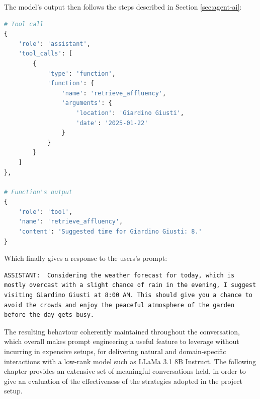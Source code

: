 The model's output then follows the steps described in Section \ref{sec:agent-ai}:

\begin{center}
\begin{minipage}{0.7\textwidth}
\begin{lstlisting}[language=Python, frame=single, caption=Tool call]
# Tool call
{
    'role': 'assistant',
    'tool_calls': [
        {
            'type': 'function',
            'function': {
                'name': 'retrieve_affluency',
                'arguments': {
                    'location': 'Giardino Giusti',
                    'date': '2025-01-22'
                }
            }
        }
    ]
},

# Function's output
{
    'role': 'tool',
    'name': 'retrieve_affluency',
    'content': 'Suggested time for Giardino Giusti: 8.'
}
\end{lstlisting}
\end{minipage}
\end{center}

Which finally gives a response to the users's prompt:

\begin{Verbatim}[breaklines=true]
ASSISTANT:  Considering the weather forecast for today, which is mostly overcast with a slight chance of rain in the evening, I suggest visiting Giardino Giusti at 8:00 AM. This should give you a chance to avoid the crowds and enjoy the peaceful atmosphere of the garden before the day gets busy.
\end{Verbatim}

The resulting behaviour coherently maintained throughout the conversation, which overall makes prompt engineering a useful feature to leverage without incurring in expensive setups, for delivering natural and domain-specific interactions with a low-rank model such as LLaMa 3.1 8B Instruct. The following chapter provides an extensive set of meaningful conversations held, in order to give an evaluation of the effectiveness of the strategies adopted in the project setup.